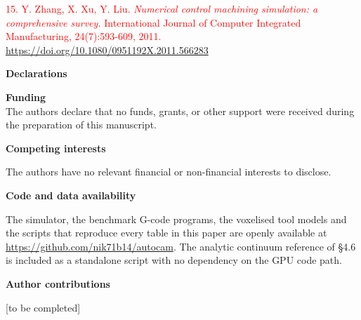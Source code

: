 \documentclass[
]{article}
\begin{document}
\textcolor{red}{15. Y. Zhang, X. Xu, Y. Liu. \emph{Numerical control machining
simulation: a comprehensive survey.} International Journal of Computer
Integrated Manufacturing, 24(7):593-609, 2011.
\url{https://doi.org/10.1080/0951192X.2011.566283}}

\textbf{Declarations}

\textbf{Funding}\\
The authors declare that no funds, grants, or other support were
received during the preparation of this manuscript.

\textbf{Competing interests}

The authors have no relevant financial or non-financial interests to
disclose.

\textbf{Code and data availability}

The simulator, the benchmark G-code programs, the voxelised tool models
and the scripts that reproduce every table in this paper are openly
available at \url{https://github.com/nik71b14/autocam}. The analytic
continuum reference of §4.6 is included as a standalone script with no
dependency on the GPU code path.

\textbf{Author contributions}

{[}to be completed{]}
\end{document}
